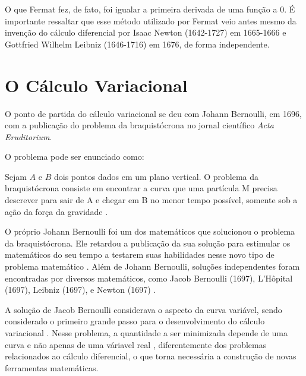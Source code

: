 \documentclass[
	12pt,				%
	openright,			%
    twoside,			%
	a4paper,			%
	english,			%
	french,				%
	spanish,			%
	brazil				%
	]{abntex2}
\numberwithin{lema}{chapter}
\numberwithin{teorema}{chapter}
\numberwithin{definicao}{chapter}
\numberwithin{figure}{chapter}
\begin{document}
O que Fermat fez, de fato, foi igualar a primeira derivada de uma função a $0$. É importante ressaltar que esse método utilizado por Fermat veio antes mesmo da invenção do cálculo diferencial por Isaac Newton (1642-1727) em 1665-1666 e Gottfried Wilhelm Leibniz (1646-1716) em 1676, de forma independente. \cite{boyer}


\section{O Cálculo Variacional}


O ponto de partida do cálculo variacional se deu com Johann Bernoulli, em 1696, com a publicação do problema da braquistócrona no jornal científico \textit{Acta Eruditorium}. \cite{hist_courant}

O problema pode ser enunciado como:
\begin{citacao}
Sejam $A$ e $B$ dois pontos dados em um plano vertical. O problema da braquistócrona consiste em encontrar a curva que uma partícula M precisa descrever para sair de A e chegar em B no menor tempo possível, somente sob a ação da força da gravidade \cite[p. 3]{calcvar}.
\end{citacao}

O próprio Johann Bernoulli foi um dos matemáticos que solucionou o problema da braquistócrona. Ele retardou a publicação da sua solução para estimular os matemáticos do seu tempo a testarem suas habilidades nesse novo tipo de problema matemático \cite{hist_courant}. Além de Johann Bernoulli, soluções independentes foram encontradas por diversos matemáticos, como Jacob Bernoulli (1697), L'Hôpital (1697), Leibniz (1697), e Newton (1697) \cite{hist_still}.

A solução de Jacob Bernoulli considerava o aspecto da curva variável, sendo considerado o primeiro grande passo para o desenvolvimento do cálculo variacional \cite{hist_still}. Nesse problema, a quantidade a ser minimizada depende de uma curva e não apenas de uma váriavel real \cite{hist_courant}, diferentemente dos problemas relacionados ao cálculo diferencial, o que torna necessária a construção de novas ferramentas matemáticas. 
\end{document}
